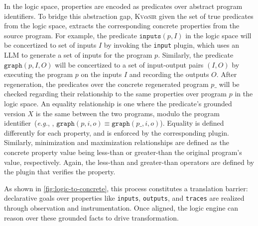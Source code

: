 \documentclass[nonacm,sigplan,review]{acmart}
\def\eg{{\em e.g.}, }
\newcommand{\sys}{{\scshape Kv{$\alpha$}sir}\xspace}
\newcommand{\ttt}[1]{\texttt{#1}\xspace}
\begin{document}
In the logic space, properties are encoded as predicates over abstract program
identifiers.
To bridge this abstraction gap, \sys given the set of true predicates
from the logic space, extracts the corresponding concrete properties from the
source program.
For example, the predicate $\ttt{inputs}(p, I)$ in the logic space
will be concertized to set of inputs $I$ by invoking the \ttt{input} plugin,
which uses an LLM to generate a set of inputs for the program $p$.
Similarly, the predicate $\ttt{graph}(p, I, O)$ will be concertized to a set of
input-output pairs $(I, O)$ by executing the program $p$ on the inputs $I$ and
recording the outputs $O$.
After regeneration, the predicates over the concrete regenerated program $p\_$
will be checked regarding their relationship to the same properties over program $p$
in the logic space.
An equality relationship is one where the predicate's grounded version
$X$ is the same between the two programs, modulo the program identifier~(\eg, $\ttt{graph}(p, i, o) \equiv \ttt{graph}(p\_, i, o)$).
Equality is defined differently for each property, and is enforced by the corresponding plugin.
Similarly, minimization and maximization relationships are defined as
the concrete property value being less-than or greater-than the original program's value, respectively.
Again, the less-than and greater-than operators are defined by the plugin that verifies the property.


As shown in \cref{fig:logic-to-concrete}, this process constitutes a
translation barrier: declarative goals over properties like \ttt{inputs},
\ttt{outputs}, and \ttt{traces} are realized through observation and
instrumentation. Once aligned, the logic engine can reason over these grounded
facts to drive transformation.
\end{document}

